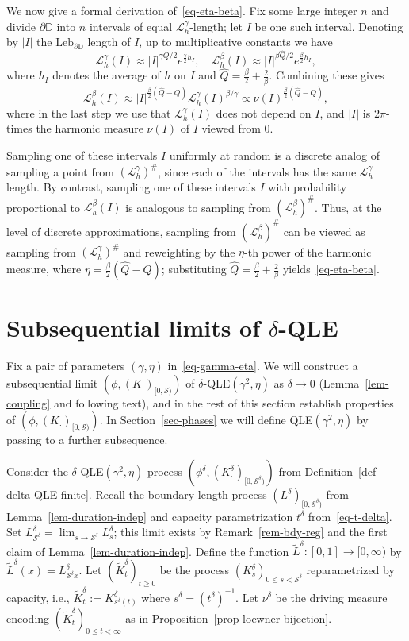 \documentclass[a4paper]{article}
\numberwithin{equation}{section}
\newcommand{\D}{\mathbb{D}}
\newcommand{\cL}{\mathcal{L}}
\newcommand{\qduration}{\mathcal{S}}
\theoremstyle{remark}
\numberwithin{equation}{section}
\begin{document}
We now give a formal derivation of~\eqref{eq-eta-beta}.
Fix some large integer $n$ and divide $\partial \D$ into $n$ intervals of equal $\cL^\gamma_h$-length; let $I$ be one such interval. Denoting by $|I|$ the $\mathrm{Leb}_{\partial \D}$ length of $I$, up to multiplicative constants we have
\[\cL^\gamma_h(I) \approx |I|^{\gamma Q/2} e^{\frac\gamma2 h_{I}}, \quad \cL^\beta_h(I) \approx |I|^{\beta \hat Q / 2} e^{\frac\beta2 h_{I}}, \]
where $h_{I}$ denotes the average of $h$ on $I$ and $\hat Q = \frac\beta2 + \frac2\beta$. 
Combining these gives
\[ \cL^\beta_h(I) \approx |I|^{\frac\beta2(\hat Q - Q)} \cL^\gamma_h(I)^{\beta/\gamma} \propto \nu(I)^{\frac\beta2(\hat Q - Q)},\]
where in the last step we use that $\cL^\gamma_h(I)$ does not depend on $I$, and $|I|$ is $2\pi$-times the harmonic measure $\nu(I)$ of $I$ viewed from $0$. 

Sampling one of these intervals $I$ uniformly at random is a discrete analog of sampling a point from $(\cL^\gamma_h)^\#$, since each of the intervals has the same $\cL^\gamma_h$ length. 
By contrast, sampling one of these intervals $I$ with probability proportional to $\cL^\beta_h(I)$ is analogous to sampling from $(\cL^\beta_h)^\#$. Thus, at the level of discrete approximations, sampling from $(\cL^\beta_h)^\#$ can be viewed as sampling from $(\cL^\gamma_h)^\#$ and reweighting by the $\eta$-th power of the harmonic measure, where $\eta = \frac\beta2(\hat Q - Q)$;  substituting $\hat Q = \frac\beta2 + \frac2\beta$ yields~\eqref{eq-eta-beta}.


\section{Subsequential limits of $\delta$-QLE}\label{sec-qle-properties}
Fix a pair of parameters $(\gamma, \eta)$ in~\eqref{eq-gamma-eta}. We will construct a  subsequential limit $(\phi, (K_\cdot)_{[0,\qduration)})$ of $\delta$-QLE$(\gamma^2, \eta)$ as $\delta \to 0$ (Lemma~\ref{lem-coupling} and following text), and in the rest of this section establish properties of $(\phi, (K_\cdot)_{[0,\qduration)})$. 
In Section~\ref{sec-phases} we will define QLE$(\gamma^2, \eta)$ by passing to a further subsequence.

Consider the $\delta$-QLE$(\gamma^2, \eta)$ process $(\phi^\delta, (K^\delta_\cdot)_{[0,\qduration^\delta)})$ from 
Definition~\ref{def-delta-QLE-finite}. Recall the boundary length process $(L^\delta_\cdot)_{[0,\qduration^\delta)}$ from Lemma~\ref{lem-duration-indep} and capacity parametrization $t^\delta$ from~\eqref{eq-t-delta}. Set $L^\delta_{\qduration^\delta} = \lim_{s \to \qduration^\delta} L^\delta_s$; this limit exists by Remark~\ref{rem-bdy-reg} and the first claim of Lemma~\ref{lem-duration-indep}.
Define the function $\tilde L^\delta:[0,1] \to [0,\infty)$ by $\tilde L^\delta(x) = L^\delta_{\qduration^\delta x}$. Let $(\tilde K^\delta_t)_{t \geq 0}$ be the process $(K_s^\delta)_{0\leq s < \qduration^\delta}$ reparametrized by capacity, i.e., $\tilde K^\delta_t := K^\delta_{s^\delta(t)}$ where $s^\delta = (t^\delta)^{-1}$. Let $\nu^\delta$ be the driving measure encoding $(\tilde K^\delta_t)_{0 \leq t < \infty}$ as in Proposition~\ref{prop-loewner-bijection}.
\end{document}
